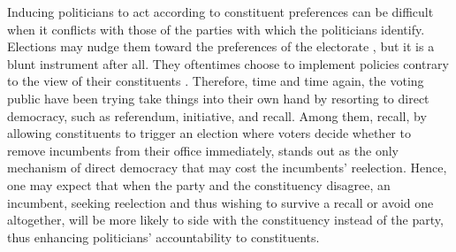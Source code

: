 \documentclass[hyphens, crop=false]{standalone}
\begin{document}
	
	Inducing politicians to act according to constituent preferences can be difficult when
	it conflicts with those of the parties with which the politicians identify.
	Elections may nudge them toward the preferences of the electorate
	\autocite{millerConstituencyInfluenceCongress1963},
	but it is a blunt instrument after all. 
	They oftentimes choose to implement policies contrary to the view of their constituents
	\autocite{kirklandIndecisionAmericanLegislatures2018}.
	Therefore, time and time again, the voting public have been trying take things into their own hand
	by resorting to direct democracy, such as referendum, initiative, and recall. 
	Among
	them,
	recall,
	by allowing constituents to trigger an election where voters decide whether to remove incumbents from their office immediately, 
	stands out as the only
	mechanism of direct democracy
	that may cost the incumbents' reelection.
	Hence,
	one may
	expect that 
	when the party and the constituency disagree,
	an incumbent,
	seeking reelection and thus 
	wishing to survive a recall or 
	avoid one altogether,
	will be more likely to side with the constituency instead of the party,
	thus enhancing politicians' accountability to constituents.
	
\end{document}
